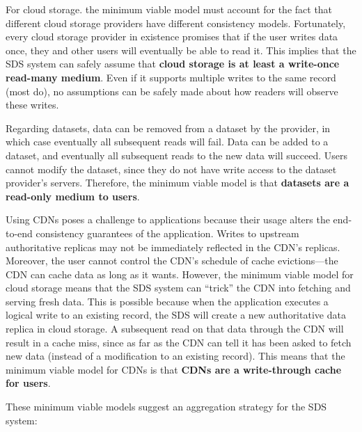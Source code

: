 For cloud storage. the minimum viable model must account for the fact that
different cloud storage providers have different consistency models.
Fortunately, every cloud storage provider in existence promises that if the user
writes data once, they and other users will eventually be able to read it.
This implies that the SDS system can safely assume that \textbf{cloud storage is
at least a write-once read-many medium}.  Even if it supports multiple writes to the
same record (most do), no assumptions can be safely made about how readers will
observe these writes.

Regarding datasets, data can be removed from a dataset by the provider, in which
case eventually all subsequent reads will fail.  Data can be added to a dataset,
and eventually all subsequent reads to the new data will succeed.  Users cannot modify the
dataset, since they do not have write access to the dataset provider's servers.
Therefore, the minimum viable model is that \textbf{datasets are a
read-only medium to users}.

Using CDNs poses a challenge to applications because their usage alters the
end-to-end consistency guarantees of the application.  Writes to upstream
authoritative replicas may not be immediately reflected in the CDN's replicas.
Moreover, the user cannot control the CDN's schedule of cache evictions---the CDN can cache data as long
as it wants.  However, the minimum viable model for cloud storage means that the
SDS system can ``trick'' the CDN into fetching and serving fresh data.  This is
possible because when the application executes a logical write to an existing
record, the SDS will create a new authoritative data replica in cloud storage.  A subsequent read on
that data through the CDN will result in a cache miss, since as far as the CDN
can tell it has been asked to fetch new data (instead of a modification to an
existing record).  This means that the minimum viable model for CDNs is that
\textbf{CDNs are a write-through cache for users}.

These minimum viable models suggest an aggregation strategy for the SDS system:

